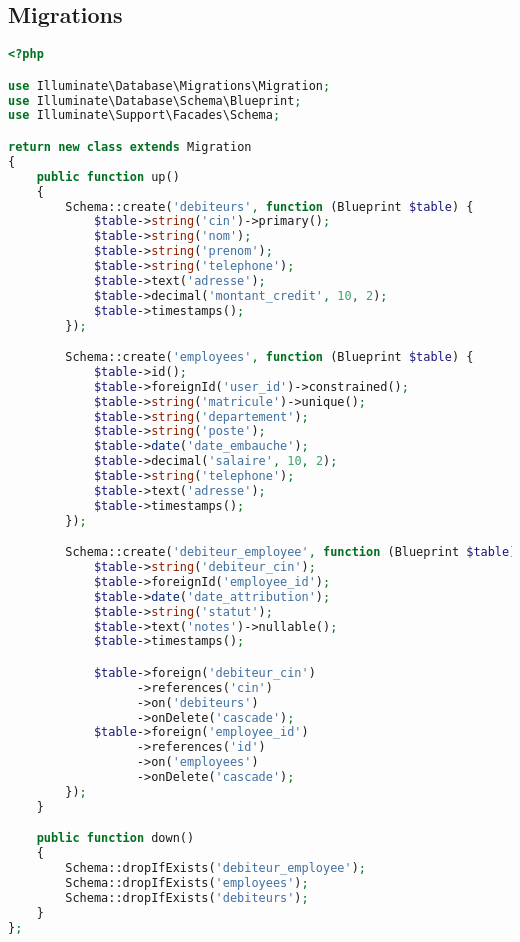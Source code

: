 \documentclass[12pt,a4paper]{report}
\begin{document}
\subsection{Migrations}
\begin{lstlisting}[language=PHP]
<?php

use Illuminate\Database\Migrations\Migration;
use Illuminate\Database\Schema\Blueprint;
use Illuminate\Support\Facades\Schema;

return new class extends Migration
{
    public function up()
    {
        Schema::create('debiteurs', function (Blueprint $table) {
            $table->string('cin')->primary();
            $table->string('nom');
            $table->string('prenom');
            $table->string('telephone');
            $table->text('adresse');
            $table->decimal('montant_credit', 10, 2);
            $table->timestamps();
        });

        Schema::create('employees', function (Blueprint $table) {
            $table->id();
            $table->foreignId('user_id')->constrained();
            $table->string('matricule')->unique();
            $table->string('departement');
            $table->string('poste');
            $table->date('date_embauche');
            $table->decimal('salaire', 10, 2);
            $table->string('telephone');
            $table->text('adresse');
            $table->timestamps();
        });

        Schema::create('debiteur_employee', function (Blueprint $table) {
            $table->string('debiteur_cin');
            $table->foreignId('employee_id');
            $table->date('date_attribution');
            $table->string('statut');
            $table->text('notes')->nullable();
            $table->timestamps();

            $table->foreign('debiteur_cin')
                  ->references('cin')
                  ->on('debiteurs')
                  ->onDelete('cascade');
            $table->foreign('employee_id')
                  ->references('id')
                  ->on('employees')
                  ->onDelete('cascade');
        });
    }

    public function down()
    {
        Schema::dropIfExists('debiteur_employee');
        Schema::dropIfExists('employees');
        Schema::dropIfExists('debiteurs');
    }
};
\end{lstlisting}
\end{document}
